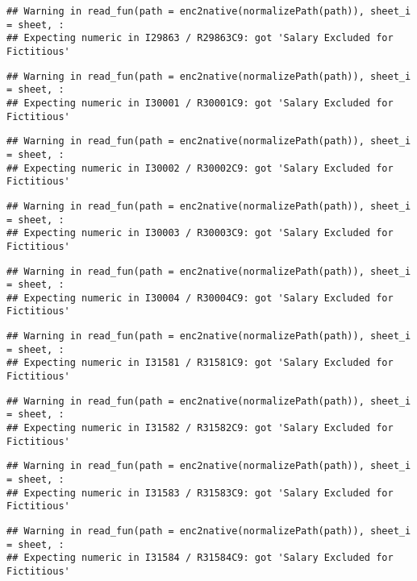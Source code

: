 \documentclass[
]{article}
\begin{document}
\begin{verbatim}
## Warning in read_fun(path = enc2native(normalizePath(path)), sheet_i = sheet, :
## Expecting numeric in I29863 / R29863C9: got 'Salary Excluded for Fictitious'
\end{verbatim}

\begin{verbatim}
## Warning in read_fun(path = enc2native(normalizePath(path)), sheet_i = sheet, :
## Expecting numeric in I30001 / R30001C9: got 'Salary Excluded for Fictitious'
\end{verbatim}

\begin{verbatim}
## Warning in read_fun(path = enc2native(normalizePath(path)), sheet_i = sheet, :
## Expecting numeric in I30002 / R30002C9: got 'Salary Excluded for Fictitious'
\end{verbatim}

\begin{verbatim}
## Warning in read_fun(path = enc2native(normalizePath(path)), sheet_i = sheet, :
## Expecting numeric in I30003 / R30003C9: got 'Salary Excluded for Fictitious'
\end{verbatim}

\begin{verbatim}
## Warning in read_fun(path = enc2native(normalizePath(path)), sheet_i = sheet, :
## Expecting numeric in I30004 / R30004C9: got 'Salary Excluded for Fictitious'
\end{verbatim}

\begin{verbatim}
## Warning in read_fun(path = enc2native(normalizePath(path)), sheet_i = sheet, :
## Expecting numeric in I31581 / R31581C9: got 'Salary Excluded for Fictitious'
\end{verbatim}

\begin{verbatim}
## Warning in read_fun(path = enc2native(normalizePath(path)), sheet_i = sheet, :
## Expecting numeric in I31582 / R31582C9: got 'Salary Excluded for Fictitious'
\end{verbatim}

\begin{verbatim}
## Warning in read_fun(path = enc2native(normalizePath(path)), sheet_i = sheet, :
## Expecting numeric in I31583 / R31583C9: got 'Salary Excluded for Fictitious'
\end{verbatim}

\begin{verbatim}
## Warning in read_fun(path = enc2native(normalizePath(path)), sheet_i = sheet, :
## Expecting numeric in I31584 / R31584C9: got 'Salary Excluded for Fictitious'
\end{verbatim}
\end{document}
